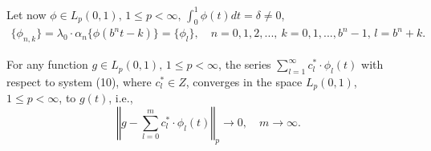 \documentclass[
11pt,%
tightenlines,%
twoside,%
onecolumn,%
nofloats,%
nobibnotes,%
nofootinbib,%
superscriptaddress,%
noshowpacs,%
centertags]%
{revtex4}
\begin{document}
Let now   $\phi\in L_p(0,1), \,
1 \leq p< \infty,\,   \int_{0}^{1} \phi(t)dt=\delta\neq 0  $,
\begin{eqnarray}
    \{\phi_{n,k}\}=\lambda_0\cdot \alpha_n \{\phi(
    b^nt-k)\}=\{\phi_{l}\},\quad n=0,1,2,..., \ k=0,1,...,b^n-1,\,
    l=b^n+k.
\end{eqnarray}
\begin{theorem} %
 For any function $ g \in L_p (0,1), \, 1
    \leq p <\infty $, the series $ \sum_{l = 1}^{\infty} c_{l}^{\ast}
    \cdot \phi_{l} (t) $    with respect to system (10), where $
    c_{l}^{\ast}  \in Z $, %
    converges in the space $L_p(0,1)$, $1 \leq p< \infty$, to $g(t)$,
    i.e.,
    $$
    \left\Vert g - \sum_{l=0}^{m} c_{l}^{\ast} \cdot \phi_{l}(t)
    \right\Vert_p \to 0,\quad m \to \infty.
    $$
\end{theorem}
\end{document}
